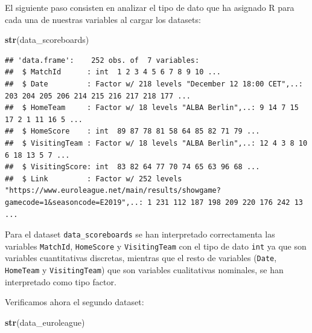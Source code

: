\documentclass[
]{article}
\newenvironment{Shaded}{\begin{snugshade}}{\end{snugshade}}
\newcommand{\KeywordTok}[1]{\textcolor[rgb]{0.13,0.29,0.53}{\textbf{#1}}}
\newcommand{\NormalTok}[1]{#1}
\begin{document}
El siguiente paso consisten en analizar el tipo de dato que ha asignado
R para cada una de nuestras variables al cargar los datasets:

\begin{Shaded}
\begin{Highlighting}[]
\KeywordTok{str}\NormalTok{(data_scoreboards)}
\end{Highlighting}
\end{Shaded}

\begin{verbatim}
## 'data.frame':    252 obs. of  7 variables:
##  $ MatchId      : int  1 2 3 4 5 6 7 8 9 10 ...
##  $ Date         : Factor w/ 218 levels "December 12 18:00 CET",..: 203 204 205 206 214 215 216 217 218 177 ...
##  $ HomeTeam     : Factor w/ 18 levels "ALBA Berlin",..: 9 14 7 15 17 2 1 11 16 5 ...
##  $ HomeScore    : int  89 87 78 81 58 64 85 82 71 79 ...
##  $ VisitingTeam : Factor w/ 18 levels "ALBA Berlin",..: 12 4 3 8 10 6 18 13 5 7 ...
##  $ VisitingScore: int  83 82 64 77 70 74 65 63 96 68 ...
##  $ Link         : Factor w/ 252 levels "https://www.euroleague.net/main/results/showgame?gamecode=1&seasoncode=E2019",..: 1 231 112 187 198 209 220 176 242 13 ...
\end{verbatim}

Para el dataset \texttt{data\_scoreboards} se han interpretado
correctamenta las variables \texttt{MatchId}, \texttt{HomeScore} y
\texttt{VisitingTeam} con el tipo de dato \texttt{int} ya que son
variables cuantitativas discretas, mientras que el resto de variables
(\texttt{Date}, \texttt{HomeTeam} y \texttt{VisitingTeam}) que son
variables cualitativas nominales, se han interpretado como tipo factor.

Verificamos ahora el segundo dataset:

\begin{Shaded}
\begin{Highlighting}[]
\KeywordTok{str}\NormalTok{(data_euroleague)}
\end{Highlighting}
\end{Shaded}
\end{document}
